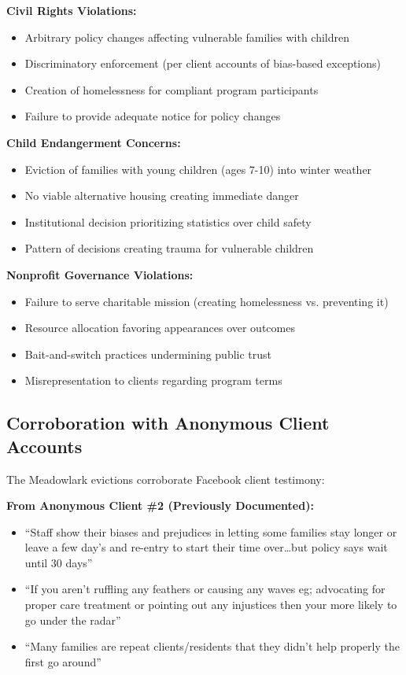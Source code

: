 \documentclass[12pt,oneside]{article}
\begin{document}
\textbf{Civil Rights Violations:}
\begin{itemize}
\item Arbitrary policy changes affecting vulnerable families with children
\item Discriminatory enforcement (per client accounts of bias-based exceptions)
\item Creation of homelessness for compliant program participants
\item Failure to provide adequate notice for policy changes
\end{itemize}

\textbf{Child Endangerment Concerns:}
\begin{itemize}
\item Eviction of families with young children (ages 7-10) into winter weather
\item No viable alternative housing creating immediate danger
\item Institutional decision prioritizing statistics over child safety
\item Pattern of decisions creating trauma for vulnerable children
\end{itemize}

\textbf{Nonprofit Governance Violations:}
\begin{itemize}
\item Failure to serve charitable mission (creating homelessness vs. preventing it)
\item Resource allocation favoring appearances over outcomes
\item Bait-and-switch practices undermining public trust
\item Misrepresentation to clients regarding program terms
\end{itemize}

\subsection*{Corroboration with Anonymous Client Accounts}

The Meadowlark evictions corroborate Facebook client testimony:

\textbf{From Anonymous Client \#2 (Previously Documented):}
\begin{itemize}
\item ``Staff show their biases and prejudices in letting some families stay longer or leave a few day's and re-entry to start their time over\ldots but policy says wait until 30 days''
\item ``If you aren't ruffling any feathers or causing any waves eg; advocating for proper care treatment or pointing out any injustices then your more likely to go under the radar''
\item ``Many families are repeat clients/residents that they didn't help properly the first go around''
\end{itemize}
\end{document}
